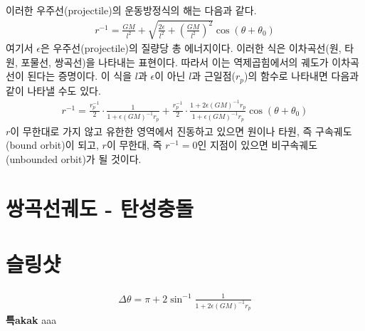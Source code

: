 \documentclass[9pt,twoside,openany]{amsbook}
\begin{document}
이러한 우주선(projectile)의 운동방정식의 해는 다음과 같다.
\begin{align}
	r^{-1} = \frac{GM}{l^2} + \sqrt{\frac{2\epsilon}{l^2}+\left(\frac{GM}{l^2}\right)^2}\cos(\theta+\theta_0)
\end{align}
여기서 $\epsilon$은 우주선(projectile)의 질량당 총 에너지이다. 이러한 식은 이차곡선(원, 타원, 포물선, 쌍곡선)을 나타내는 표현이다. 따라서 이는 역제곱힘에서의 궤도가 이차곡선이 된다는 증명이다.
이 식을 $l$과 $\epsilon$이 아닌 $l$과 근일점($r_p$)의 함수로 나타내면 다음과 같이 나타낼 수도 있다.
\begin{align}
	r^{-1} = \frac{r_p^{-1}}{2}\cdot\frac{1}{1+\epsilon (GM)^{-1}r_p} +\frac{r_p^{-1}}{2}\cdot\frac{1+2\epsilon (GM)^{-1}r_p}{1+\epsilon (GM)^{-1}r_p}\cos(\theta+\theta_0)
\end{align}
$r$이 무한대로 가지 않고 유한한 영역에서 진동하고 있으면 원이나 타원, 즉 구속궤도(bound orbit)이 되고, $r$이 무한대, 즉 $r^{-1}=0$인 지점이 있으면 비구속궤도(unbounded orbit)가 될 것이다.

\section{쌍곡선궤도 - 탄성충돌}
\section{슬링샷}

\begin{align}
	\Delta \theta = \pi + 2\sin^{-1}\frac{1}{{1+2\epsilon (GM)^{-1}r_p}}
\end{align}
\textbf{\textsf{\large 특akak}}\;\; aaa
\end{document}
